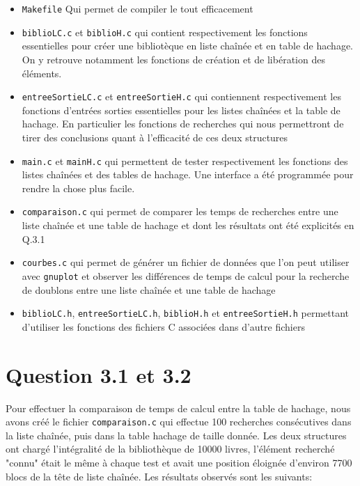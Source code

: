 \documentclass{article}
\begin{document}
    \begin{itemize}
        \item \texttt{Makefile} Qui permet de compiler le tout efficacement
        \item \texttt{biblioLC.c} et \texttt{biblioH.c} qui contient respectivement
        les fonctions essentielles pour créer une bibliotèque en liste chaînée et
        en table de hachage. On y retrouve notamment les fonctions de création et
        de libération des éléments.
        \item \texttt{entreeSortieLC.c} et \texttt{entreeSortieH.c} qui contiennent
        respectivement les fonctions d'entrées sorties essentielles pour les listes chaînées
        et la table de hachage. En particulier les fonctions de recherches qui nous
        permettront de tirer des conclusions quant à l'efficacité de ces deux structures
        \item \texttt{main.c} et \texttt{mainH.c} qui permettent de tester respectivement
        les fonctions des listes chaînées et des tables de hachage. Une interface a été
        programmée pour rendre la chose plus facile.
        \item \texttt{comparaison.c} qui permet de comparer les temps de recherches entre
        une liste chaînée et une table de hachage et dont les résultats ont été explicités
        en Q.3.1
        \item \texttt{courbes.c} qui permet de générer un fichier de données 
        que l'on peut utiliser avec \texttt{gnuplot} et observer les différences
        de temps de calcul pour la recherche de doublons entre une liste chaînée et
        une table de hachage
        \item \texttt{biblioLC.h}, \texttt{entreeSortieLC.h}, \texttt{biblioH.h} et \texttt{entreeSortieH.h}
        permettant d'utiliser les fonctions des fichiers C associées dans d'autre fichiers
    \end{itemize}
    

    \newpage
    \section{Question 3.1 et 3.2}

    Pour effectuer la comparaison de temps de calcul entre la table de hachage, nous avons créé
    le fichier \texttt{comparaison.c} qui effectue 100 recherches consécutives 
    dans la liste chaînée, puis dans la table hachage de taille donnée. 
    \newline
    Les deux structures ont chargé l'intégralité de la bibliothèque de 10000 livres,
    l'élément recherché "connu" était le même à chaque test et avait une position éloignée
    d'environ 7700 blocs de la tête de liste chaînée.
    \newline
    Les résultats observés sont les suivants:
\end{document}
